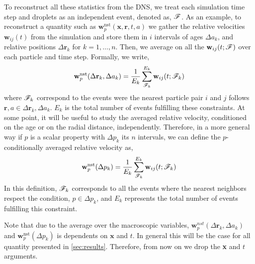 To reconstruct all these statistics from the DNS, we treat each simulation time step and droplets as an independent event, denoted as, $\mathscr{F}$. 
As an example, to reconstruct a quantity such as $\textbf{w}^\text{nst}_p(\textbf{x},\textbf{r},t,a)$ we gather the relative velocities $\textbf{w}_{ij}(t)$ from the simulation and store them in $i$ intervals of ages $\Delta a_k$, and relative positions $\Delta \textbf{r}_k$ for $k = 1,\ldots, n$.
Then, we average on all the $\textbf{w}_{ij}(t;\mathscr{F})$ over each particle and time step.
Formally, we write, 
\begin{equation}
    \textbf{w}^\text{nst}_p(\Delta\textbf{r}_k,\Delta a_k)
    = \frac{1}{E_k} 
    \sum^{E_k}_{\FF_k} 
    \textbf{w}_{ij}(t;\FF_k)
    \label{eq:vec_cond}
\end{equation}
where $\mathscr{F}_k$ correspond to the events were the nearest particle pair $i$ and $j$ follows $\textbf{r},a \in \Delta \textbf{r}_k ,\Delta a_k$.
$E_k$ is the total number of events fulfilling these constraints. 
At some point, it will be useful to study the averaged relative velocity, conditioned on the age or on the radial distance, independently. 
Therefore, in a more general way if $p$ is a scalar property with $\Delta p_k$ its $n$ intervals, we can define the $p$-conditionally averaged relative velocity as, 
\begin{equation}
    \textbf{w}^\text{nst}_p(\Delta p_k)
    = \frac{1}{E_{k}} 
    \sum^{E_{k}}_{\FF_{k}}  
    \textbf{w}_{ij}(t;\FF_k)
    \label{eq:scalar_cond}
\end{equation}
In this definition, $\mathscr{F}_{k}$ corresponds to all the events where the nearest neighbors respect the condition, $p \in \Delta p_k$, and $E_{k}$ represents the total number of events fulfilling this constraint. 

Note that due to the average over the macroscopic variables, $\textbf{w}_p^{nst}(\Delta\textbf{r}_k,\Delta a_k)$ and $\textbf{w}^\text{nst}_p(\Delta p_k)$ is dependents on $\textbf{x}$ and $t$. 
In general this will be the case for all quantity presented in \ref{sec:results}. 
Therefore, from now on we drop the \textbf{x} and $t$ arguments. 



